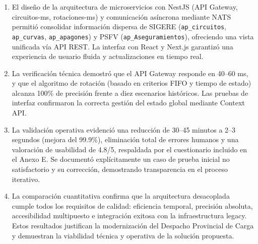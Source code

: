 \begin{enumerate}
    \item El diseño de la arquitectura de microservicios con NestJS (API Gateway, circuitos-ms, rotaciones-ms) y comunicación asíncrona mediante NATS permitió consolidar información dispersa de SIGERE (\texttt{ap\_circuitos}, \texttt{ap\_curvas}, \texttt{ap\_apagones}) y PSFV (\texttt{ap\_Aseguramientos}), ofreciendo una vista unificada vía API REST. La interfaz con React y Next.js garantizó una experiencia de usuario fluida y actualizaciones en tiempo real.
     
    \item La verificación técnica demostró que el API Gateway responde en 40–60 ms, y que el algoritmo de rotación (basado en criterios FIFO y tiempo de estado) alcanza 100\% de precisión frente a diez escenarios históricos. Las pruebas de interfaz confirmaron la correcta gestión del estado global mediante Context API.
     
    \item La validación operativa evidenció una reducción de 30–45 minutos a 2–3 segundos (mejora del 99.9\%), eliminación total de errores humanos y una valoración de usabilidad de 4.8/5, respaldada por el cuestionario incluido en el Anexo E. Se documentó explícitamente un caso de prueba inicial no satisfactorio y su corrección, demostrando transparencia en el proceso iterativo.
     
    \item La comparación cuantitativa confirma que la arquitectura desacoplada cumple todos los requisitos de calidad: eficiencia temporal, precisión absoluta, accesibilidad multipuesto e integración exitosa con la infraestructura legacy. Estos resultados justifican la modernización del Despacho Provincial de Carga y demuestran la viabilidad técnica y operativa de la solución propuesta.
\end{enumerate}